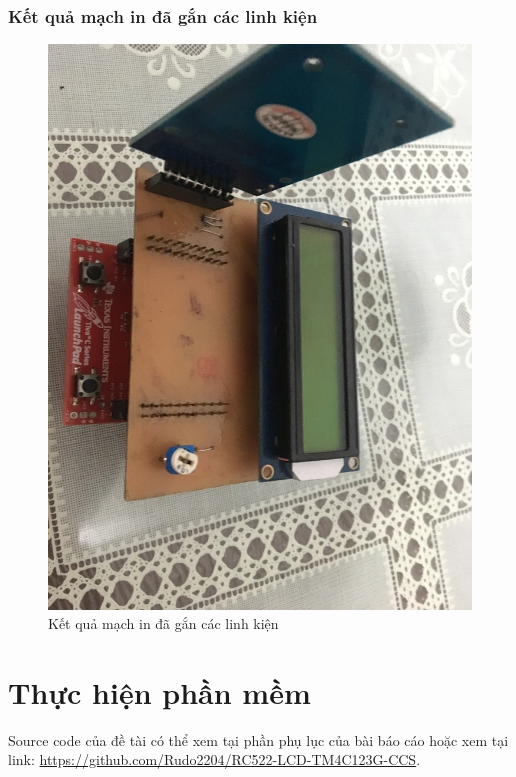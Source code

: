 \newpage
\subsubsection{Kết quả mạch in đã gắn các linh kiện}
\begin{figure}[ht]
\centering
\includegraphics[scale=0.3]{images/board_finish.jpg}
\caption{Kết quả mạch in đã gắn các linh kiện}
\end{figure}

\section{Thực hiện phần mềm}
Source code của đề tài có thể xem tại phần phụ lục của bài báo cáo hoặc xem tại link: \url{https://github.com/Rudo2204/RC522-LCD-TM4C123G-CCS}.

